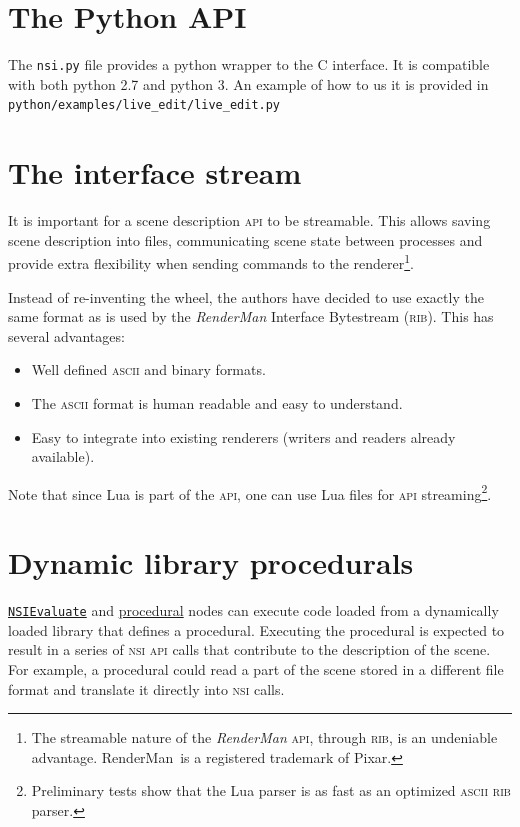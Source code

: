 \documentclass[oneside,ebook]{memoir}
\newcommand*{\acronym}[1]{\textsc{\lowercase{#1}}}
\begin{document}
\section{The Python API}
\label{section:Python}
The \lstinline|nsi.py| file provides a python wrapper to the \textsc{C} interface.
It is compatible with both python 2.7 and python 3.
An example of how to us it is provided in \lstinline|python/examples/live_edit/live_edit.py|

\section{The interface stream}
\label{section:nsistream}
It is important for a scene description \acronym{API} to be streamable. This allows saving scene description into files, communicating scene state between processes and provide extra flexibility when sending commands to the renderer\footnote{The streamable nature of the \textit{RenderMan} \acronym{API}, through \acronym{RIB}, is an undeniable advantage. \mbox{RenderMan\textregistered{}}\ is a registered trademark of Pixar.}.

Instead of re-inventing the wheel, the authors have decided to use exactly the same format as is used by the \textit{RenderMan} Interface Bytestream (\acronym{RIB}). This has several advantages:
\begin{itemize}
\item Well defined \acronym{ASCII} and binary formats.
\item The \acronym{ASCII} format is human readable and easy to understand.
\item Easy to integrate into existing renderers (writers and readers already available).
\end{itemize}
Note that since Lua is part of the \acronym{API}, one can use Lua files for \acronym{API} streaming\footnote{Preliminary tests show that the Lua parser is as fast as an optimized \acronym{ASCII} \acronym{RIB} parser.}.
\label{section:rib}

\section{Dynamic library procedurals}
\label{section:dllprocedurals}
\hyperref[CAPI:nsievaluate]{\lstinline|NSIEvaluate|} and \hyperref[section:proceduralnode]{procedural} nodes can execute code loaded from a dynamically loaded library that defines a procedural.
Executing the procedural is expected to result in a series of \acronym{NSI} \acronym{API} calls that contribute to the description of the scene.
For example, a procedural could read a part of the scene stored in a different file format and translate it directly into \acronym{NSI} calls.
\end{document}

